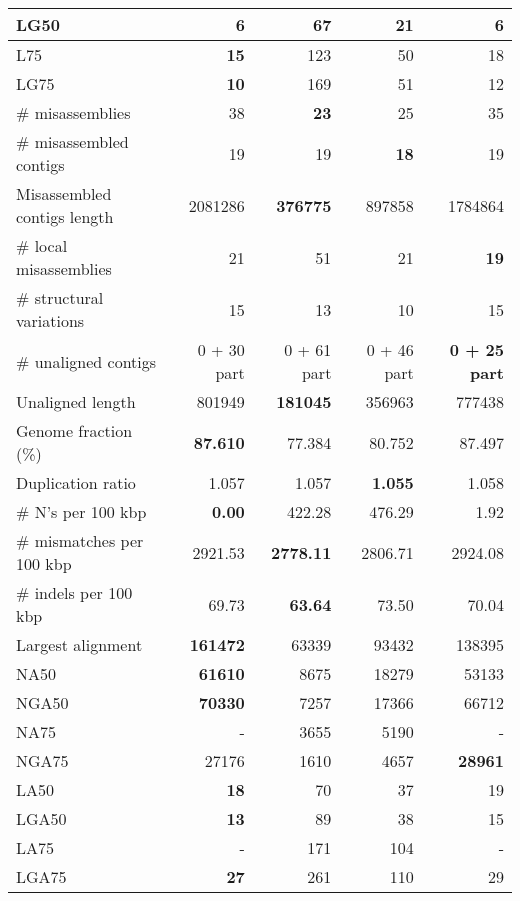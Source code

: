 \documentclass[12pt,a4paper]{article}
\begin{document}
\begin{table}[ht]
\begin{center}
\begin{tabular}{|l*{4}{|r}|}
LG50 & {\bf 6} & 67 & 21 & {\bf 6} \\ \hline
L75 & {\bf 15} & 123 & 50 & 18 \\ \hline
LG75 & {\bf 10} & 169 & 51 & 12 \\ \hline
\# misassemblies & 38 & {\bf 23} & 25 & 35 \\ \hline
\# misassembled contigs & 19 & 19 & {\bf 18} & 19 \\ \hline
Misassembled contigs length & 2081286 & {\bf 376775} & 897858 & 1784864 \\ \hline
\# local misassemblies & 21 & 51 & 21 & {\bf 19} \\ \hline
\# structural variations & 15 & 13 & 10 & 15 \\ \hline
\# unaligned contigs & 0 + 30 part & 0 + 61 part & 0 + 46 part & {\bf 0 + 25 part} \\ \hline
Unaligned length & 801949 & {\bf 181045} & 356963 & 777438 \\ \hline
Genome fraction (\%) & {\bf 87.610} & 77.384 & 80.752 & 87.497 \\ \hline
Duplication ratio & 1.057 & 1.057 & {\bf 1.055} & 1.058 \\ \hline
\# N's per 100 kbp & {\bf 0.00} & 422.28 & 476.29 & 1.92 \\ \hline
\# mismatches per 100 kbp & 2921.53 & {\bf 2778.11} & 2806.71 & 2924.08 \\ \hline
\# indels per 100 kbp & 69.73 & {\bf 63.64} & 73.50 & 70.04 \\ \hline
Largest alignment & {\bf 161472} & 63339 & 93432 & 138395 \\ \hline
NA50 & {\bf 61610} & 8675 & 18279 & 53133 \\ \hline
NGA50 & {\bf 70330} & 7257 & 17366 & 66712 \\ \hline
NA75 & - & 3655 & 5190 & - \\ \hline
NGA75 & 27176 & 1610 & 4657 & {\bf 28961} \\ \hline
LA50 & {\bf 18} & 70 & 37 & 19 \\ \hline
LGA50 & {\bf 13} & 89 & 38 & 15 \\ \hline
LA75 & - & 171 & 104 & - \\ \hline
LGA75 & {\bf 27} & 261 & 110 & 29 \\ \hline
\end{tabular}
\end{center}
\end{table}
\end{document}
